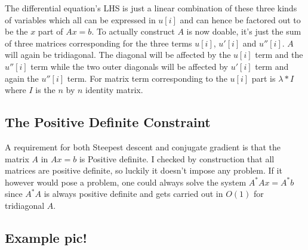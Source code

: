 \documentclass[a4paper,11pt]{article}
\begin{document}
The differential equation's LHS is just a linear combination of these
three kinds of variables which all can be expressed in $u[i]$ and can
hence be factored out to be the $x$ part of $Ax=b$. To actually
construct $A$ is now doable, it's just the sum of three matrices
corresponding for the three terms $u[i]$, $u'[i]$ and $u''[i]$. $A$ will
again be tridiagonal. The diagonal will be affected by the $u[i]$ term
and the $u''[i]$ term while the two outer diagonals will be affected by
$u'[i]$ term and again the $u''[i]$ term. For matrix term corresponding
to the $u[i]$ part is $\lambda*I$ where $I$ is the $n$ by $n$ identity
matrix.

\subsection{The Positive Definite Constraint}

A requirement for both Steepest descent and conjugate gradient is that
the matrix $A$ in $Ax=b$ is Positive definite. I checked by construction
that all matrices are positive definite, so luckily it doesn't impose
any problem. If it however would pose a problem, one could always solve
the system $A^{*}Ax=A^{*}b$ since $A^*A$ is always positive definite and
gets carried out in $O(1)$ for tridiagonal $A$.










\subsection{Example pic!}
\end{document}
